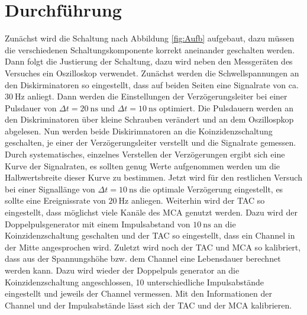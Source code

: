 \section{Durchführung}
	
	Zunächst wird die Schaltung nach Abbildung \ref{fig:Aufb} aufgebaut, dazu müssen die verschiedenen Schaltungskomponente korrekt aneinander geschalten werden.
	Dann folgt die Justierung der Schaltung, dazu wird neben den Messgeräten des Versuches ein Oszilloskop verwendet.
	Zunächst werden die Schwellspannungen an den Diskirminatoren so eingestellt, dass auf beiden Seiten eine Signalrate von ca. $\SI{30}{\hertz}$ anliegt. 
    Dann werden die Einstellungen der Verzögerungsleiter bei einer Pulsdauer von $\Delta t= \SI{20}{\nano\second}$ und $\Delta t= \SI{10}{\nano\second}$ optimiert.
	Die Pulsdauern werden an den Diskriminatoren über kleine Schrauben verändert und an dem Oszillospkop abgelesen.
	Nun werden beide Diskirimnatoren an die Koinzidenzschaltung geschalten, je einer der Verzögerungsleiter verstellt und die Signalrate gemessen.
	Durch systematisches, einzelnes Verstellen der Verzögerungen ergibt sich eine Kurve der Signalraten, es sollten genug Werte aufgenommen werden um die Halbwertsbreite dieser Kurve zu bestimmen.
	Jetzt wird für den restlichen Versuch bei einer Signallänge von $\Delta t= \SI{10}{\nano\second}$ die optimale Verzögerung eingestellt, es sollte eine Ereignissrate von $\SI{20}{\hertz}$ anliegen.
	Weiterhin wird der TAC so eingestellt, dass möglichst viele Kanäle des MCA genutzt werden.
	Dazu wird der Doppelpulsgenerator mit einem Impulsabstand von $\SI{10}{\nano\second}$ an die Koinzidenzschaltung geschalten und der TAC so eingestellt, dass ein Channel in der Mitte angesprochen wird.
	Zuletzt wird noch der TAC und MCA so kalibriert, dass aus der Spannungshöhe bzw. dem Channel eine Lebensdauer berechnet werden kann.
	Dazu wird wieder der Doppelpuls generator an die Koinzidenzschaltung angeschlossen, 10 unterschiedliche Impulsabstände eingestellt und jeweils der Channel vermessen.
	Mit den Informationen der Channel und der Impulsabstände lässt sich der TAC und der MCA kalibrieren.

